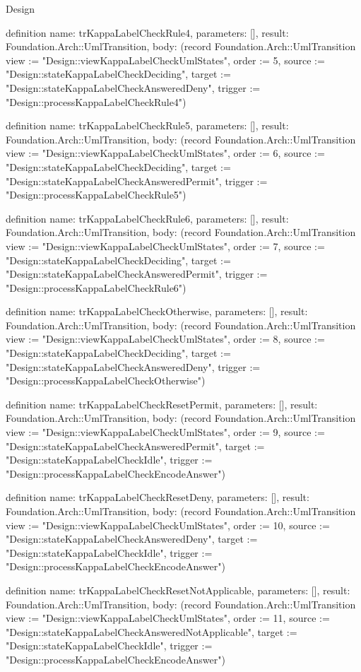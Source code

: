 \begin{lexlean}{Design}
\begin{semanticmodule}
definition{
  name: trKappaLabelCheckRule4,
  parameters: [],
  result: Foundation.Arch::UmlTransition,
  body: (record Foundation.Arch::UmlTransition {view := "Design::viewKappaLabelCheckUmlStates", order := 5, source := "Design::stateKappaLabelCheckDeciding", target := "Design::stateKappaLabelCheckAnsweredDeny", trigger := "Design::processKappaLabelCheckRule4"})
}

definition{
  name: trKappaLabelCheckRule5,
  parameters: [],
  result: Foundation.Arch::UmlTransition,
  body: (record Foundation.Arch::UmlTransition {view := "Design::viewKappaLabelCheckUmlStates", order := 6, source := "Design::stateKappaLabelCheckDeciding", target := "Design::stateKappaLabelCheckAnsweredPermit", trigger := "Design::processKappaLabelCheckRule5"})
}

definition{
  name: trKappaLabelCheckRule6,
  parameters: [],
  result: Foundation.Arch::UmlTransition,
  body: (record Foundation.Arch::UmlTransition {view := "Design::viewKappaLabelCheckUmlStates", order := 7, source := "Design::stateKappaLabelCheckDeciding", target := "Design::stateKappaLabelCheckAnsweredPermit", trigger := "Design::processKappaLabelCheckRule6"})
}

definition{
  name: trKappaLabelCheckOtherwise,
  parameters: [],
  result: Foundation.Arch::UmlTransition,
  body: (record Foundation.Arch::UmlTransition {view := "Design::viewKappaLabelCheckUmlStates", order := 8, source := "Design::stateKappaLabelCheckDeciding", target := "Design::stateKappaLabelCheckAnsweredDeny", trigger := "Design::processKappaLabelCheckOtherwise"})
}

definition{
  name: trKappaLabelCheckResetPermit,
  parameters: [],
  result: Foundation.Arch::UmlTransition,
  body: (record Foundation.Arch::UmlTransition {view := "Design::viewKappaLabelCheckUmlStates", order := 9, source := "Design::stateKappaLabelCheckAnsweredPermit", target := "Design::stateKappaLabelCheckIdle", trigger := "Design::processKappaLabelCheckEncodeAnswer"})
}

definition{
  name: trKappaLabelCheckResetDeny,
  parameters: [],
  result: Foundation.Arch::UmlTransition,
  body: (record Foundation.Arch::UmlTransition {view := "Design::viewKappaLabelCheckUmlStates", order := 10, source := "Design::stateKappaLabelCheckAnsweredDeny", target := "Design::stateKappaLabelCheckIdle", trigger := "Design::processKappaLabelCheckEncodeAnswer"})
}

definition{
  name: trKappaLabelCheckResetNotApplicable,
  parameters: [],
  result: Foundation.Arch::UmlTransition,
  body: (record Foundation.Arch::UmlTransition {view := "Design::viewKappaLabelCheckUmlStates", order := 11, source := "Design::stateKappaLabelCheckAnsweredNotApplicable", target := "Design::stateKappaLabelCheckIdle", trigger := "Design::processKappaLabelCheckEncodeAnswer"})
}


\end{semanticmodule}
\end{lexlean}
